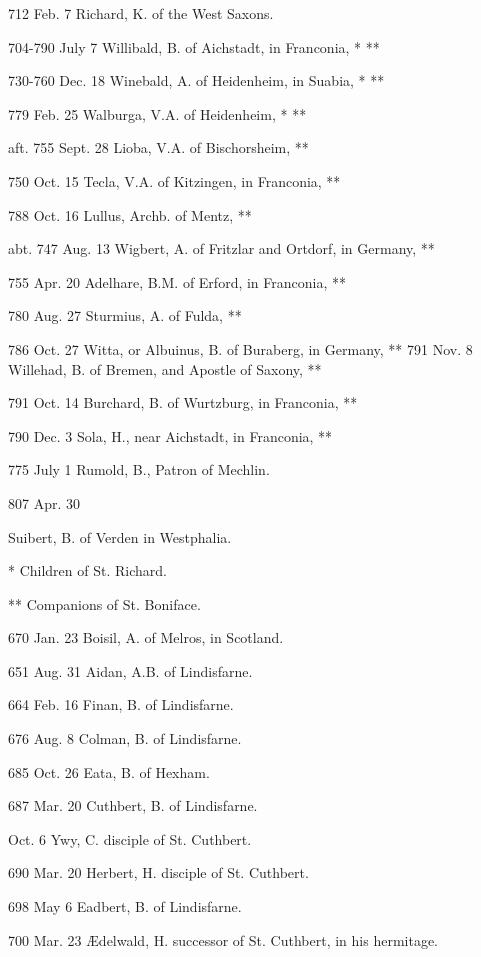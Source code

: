 712 Feb.
7
Richard, K. of the West Saxons.

704-790 July
7
Willibald,
B. of Aichstadt, in Franconia, * **

730-760 Dec.
18
Winebald,
A. of Heidenheim, in Suabia, * **

779 Feb.
25
Walburga, V.A. of Heidenheim, * **

aft. 755 Sept.
28
Lioba,
V.A. of Bischorsheim, **

750 Oct.
15
Tecla, V.A. of Kitzingen, in Franconia, **

788 Oct.
16
Lullus, Archb. of Mentz, **

abt. 747 Aug.
13
Wigbert,
A. of Fritzlar and Ortdorf, in Germany, **

755 Apr.
20
Adelhare, B.M. of Erford, in Franconia, **

780 Aug.
27
Sturmius, A. of Fulda, **

786 Oct.
27
Witta, or Albuinus, B. of Buraberg, in Germany, ** 791 Nov. 8
Willehad,
B. of Bremen, and Apostle of Saxony, **

791 Oct.
14
Burchard, B. of Wurtzburg, in Franconia, **

790 Dec.
3
Sola, H., near Aichstadt, in Franconia, **

775 July
1
Rumold, B., Patron of Mechlin.

807 Apr.
30

Suibert, B. of Verden in Westphalia.

* Children of St. Richard.

** Companions of St. Boniface.


670 Jan.
23
Boisil,
A. of Melros, in Scotland.

651 Aug.
31
Aidan, A.B. of Lindisfarne.

664 Feb.
16
Finan, B. of Lindisfarne.

676 Aug.
8
Colman, B. of Lindisfarne.

685 Oct.
26
Eata, B. of Hexham.

687 Mar.
20
Cuthbert, B. of Lindisfarne.

Oct. 6
Ywy, C. disciple of St. Cuthbert.

690 Mar.
20
Herbert, H. disciple of St. Cuthbert.

698 May
6
Eadbert, B. of Lindisfarne.

700 Mar.
23
Ædelwald, H. successor of St. Cuthbert, in his hermitage.

